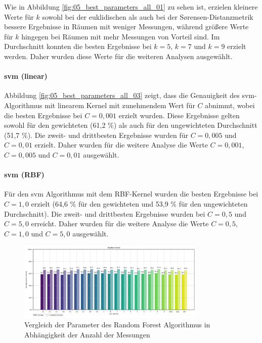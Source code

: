 Wie in Abbildung \ref{fig:05_best_parameters_all_01} zu sehen ist, erzielen kleinere Werte für \( k \) sowohl bei der euklidischen als auch bei der Sørensen-Distanzmetrik bessere Ergebnisse in Räumen mit weniger Messungen, während größere Werte für \( k \) hingegen bei Räumen mit mehr Messungen von Vorteil sind. Im Durchschnitt konnten die besten Ergebnisse bei \( k = 5 \), \( k = 7 \) und \( k = 9 \) erzielt werden. Daher wurden diese Werte für die weiteren Analysen ausgewählt.

\paragraph{\gls{svm} (linear)}

Abbildung \ref{fig:05_best_parameters_all_03} zeigt, dass die Genauigkeit des \gls{svm}-Algorithmus mit linearem Kernel mit zunehmendem Wert für \( C \) abnimmt, wobei die besten Ergebnisse bei \( C = 0{,}001 \) erzielt wurden. Diese Ergebnisse gelten sowohl für den gewichteten (61,2 \%) als auch für den ungewichteten Durchschnitt (51,7 \%). Die zweit- und drittbesten Ergebnisse wurden für \( C = 0{,}005 \) und \( C = 0{,}01 \) erzielt. Daher wurden für die weitere Analyse die Werte \( C = 0{,}001 \), \( C = 0{,}005 \) und \( C = 0{,}01 \) ausgewählt.

\paragraph{\gls{svm} (RBF)}

Für den \gls{svm} Algorithmus mit dem RBF-Kernel wurden die besten Ergebnisse bei \( C = 1{,}0 \) erzielt (64,6 \% für den gewichteten und 53,9 \% für den ungewichteten Durchschnitt). Die zweit- und drittbesten Ergebnisse wurden bei \( C = 0{,}5 \) und \( C = 5{,}0 \) erreicht. Daher wurden für die weitere Analyse die Werte \( C = 0{,}5 \), \( C = 1{,}0 \) und \( C = 5{,}0 \) ausgewählt.

\begin{figure}[H]
    \centering
    \includegraphics[width=0.8\textwidth]{images/05_best_parameters_random_forest_03.png}
    \caption{Vergleich der Parameter des Random Forest Algorithmus in Abhängigkeit der Anzahl der Messungen}
    \label{fig:05_best_parameters_random_forest_03}
\end{figure}


